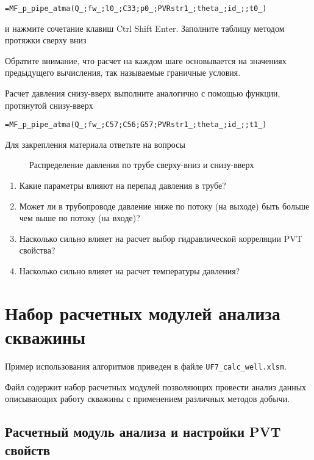 { \small  \texttt{=MF\_p\_pipe\_atma(Q\_;fw\_;l0\_;C33;p0\_;PVRstr1\_;theta\_;id\_;;t0\_)
}}

и нажмите сочетание клавиш Ctrl Shift Enter. Заполните таблицу методом протяжки сверху вниз

Обратите внимание, что расчет на каждом шаге основывается на значениях предыдущего вычисления, так называемые граничные условия. 

Расчет давления снизу-вверх выполните аналогично с помощью функции, протянутой снизу-вверх

{ \small  \texttt{=MF\_p\_pipe\_atma(Q\_;fw\_;C57;C56;G57;PVRstr1\_;theta\_;id\_;;t1\_)
}}

Для закрепления материала ответьте на вопросы


\begin{figure}[h!]
	\center{\texttt{[image: Ex50\_2]}}
	\caption{Распределение давления по трубе сверху-вниз и снизу-вверх}
	\label{ris:Ex50_2}
\end{figure}

\begin{enumerate}
	\item Какие параметры влияют на перепад давления в трубе?
	\item Может ли в трубопроводе давление ниже по потоку (на выходе) быть больше чем выше по потоку (на входе)?
	\item Насколько сильно влияет на расчет выбор гидравлической корреляции PVT свойства?
	\item Насколько сильно влияет на расчет температуры давления?
\end{enumerate}


\section{Набор расчетных модулей анализа скважины}
Пример использования алгоритмов \unf   приведен в файле \texttt{UF7\_calc\_well.xlsm}.

Файл содержит набор расчетных модулей позволяющих провести анализ данных описывающих работу скважины с применением различных методов добычи.

\subsection{Расчетный модуль анализа и настройки PVT свойств}

